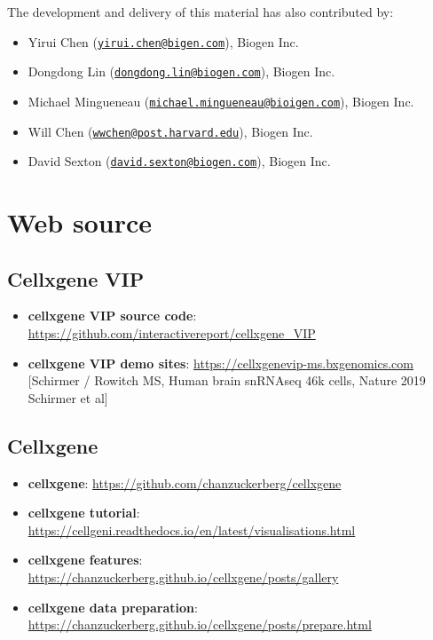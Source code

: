 \documentclass[
]{article}
\providecommand{\tightlist}{%
  \setlength{\itemsep}{0pt}\setlength{\parskip}{0pt}}
\begin{document}
The development and delivery of this material has also contributed by:

\begin{itemize}
\tightlist
\item
  Yirui Chen (\href{mailto:yirui.chen@bigen.com}{\nolinkurl{yirui.chen@bigen.com}}), Biogen Inc.
\item
  Dongdong Lin (\href{mailto:dongdong.lin@biogen.com}{\nolinkurl{dongdong.lin@biogen.com}}), Biogen Inc.
\item
  Michael Mingueneau (\href{mailto:michael.mingueneau@bioigen.com}{\nolinkurl{michael.mingueneau@bioigen.com}}), Biogen Inc.
\item
  Will Chen (\href{mailto:wwchen@post.harvard.edu}{\nolinkurl{wwchen@post.harvard.edu}}), Biogen Inc.
\item
  David Sexton (\href{mailto:david.sexton@biogen.com}{\nolinkurl{david.sexton@biogen.com}}), Biogen Inc.
\end{itemize}

\hypertarget{web-source}{%
\section{Web source}\label{web-source}}

\hypertarget{cellxgene-vip}{%
\subsection*{Cellxgene VIP}\label{cellxgene-vip}}

\begin{itemize}
\tightlist
\item
  \textbf{cellxgene VIP source code}: \url{https://github.com/interactivereport/cellxgene_VIP}
\item
  \textbf{cellxgene VIP demo sites}: \url{https://cellxgenevip-ms.bxgenomics.com} {[}Schirmer / Rowitch MS, Human brain snRNAseq 46k cells, Nature 2019 Schirmer et al{]}
\end{itemize}

\hypertarget{cellxgene}{%
\subsection*{Cellxgene}\label{cellxgene}}

\begin{itemize}
\tightlist
\item
  \textbf{cellxgene}: \url{https://github.com/chanzuckerberg/cellxgene}
\item
  \textbf{cellxgene tutorial}: \url{https://cellgeni.readthedocs.io/en/latest/visualisations.html}
\item
  \textbf{cellxgene features}: \url{https://chanzuckerberg.github.io/cellxgene/posts/gallery}
\item
  \textbf{cellxgene data preparation}: \url{https://chanzuckerberg.github.io/cellxgene/posts/prepare.html}
\end{itemize}
\end{document}
